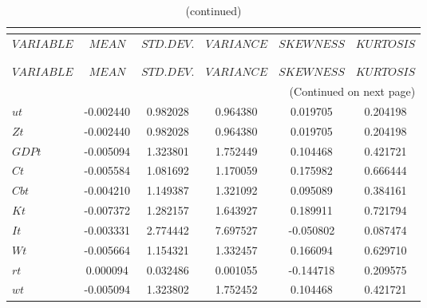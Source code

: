  
\begin{center}
\begin{longtable}{lccccc} 
\caption{MOMENTS OF SIMULATED VARIABLES}\\
 \label{Table:sim_moments}\\
\toprule 
$VARIABLE  $	 & 	 $            MEAN$	 & 	 $       STD. DEV.$	 & 	 $        VARIANCE$	 & 	 $        SKEWNESS$	 & 	 $        KURTOSIS$\\
\midrule \endfirsthead 
\caption{(continued)}\\
 \toprule \\ 
$VARIABLE  $	 & 	 $            MEAN$	 & 	 $       STD. DEV.$	 & 	 $        VARIANCE$	 & 	 $        SKEWNESS$	 & 	 $        KURTOSIS$\\
\midrule \endhead 
\midrule \multicolumn{6}{r}{(Continued on next page)} \\ \bottomrule \endfoot 
\bottomrule \endlastfoot 
$ut        $	 & 	       -0.002440	 & 	        0.982028	 & 	        0.964380	 & 	        0.019705	 & 	        0.204198 \\ 
$Zt        $	 & 	       -0.002440	 & 	        0.982028	 & 	        0.964380	 & 	        0.019705	 & 	        0.204198 \\ 
$GDPt      $	 & 	       -0.005094	 & 	        1.323801	 & 	        1.752449	 & 	        0.104468	 & 	        0.421721 \\ 
$Ct        $	 & 	       -0.005584	 & 	        1.081692	 & 	        1.170059	 & 	        0.175982	 & 	        0.666444 \\ 
$Cbt       $	 & 	       -0.004210	 & 	        1.149387	 & 	        1.321092	 & 	        0.095089	 & 	        0.384161 \\ 
$Kt        $	 & 	       -0.007372	 & 	        1.282157	 & 	        1.643927	 & 	        0.189911	 & 	        0.721794 \\ 
$It        $	 & 	       -0.003331	 & 	        2.774442	 & 	        7.697527	 & 	       -0.050802	 & 	        0.087474 \\ 
$Wt        $	 & 	       -0.005664	 & 	        1.154321	 & 	        1.332457	 & 	        0.166094	 & 	        0.629710 \\ 
$rt        $	 & 	        0.000094	 & 	        0.032486	 & 	        0.001055	 & 	       -0.144718	 & 	        0.209575 \\ 
$wt        $	 & 	       -0.005094	 & 	        1.323802	 & 	        1.752452	 & 	        0.104468	 & 	        0.421721 \\ 

\end{longtable}
\end{center}
